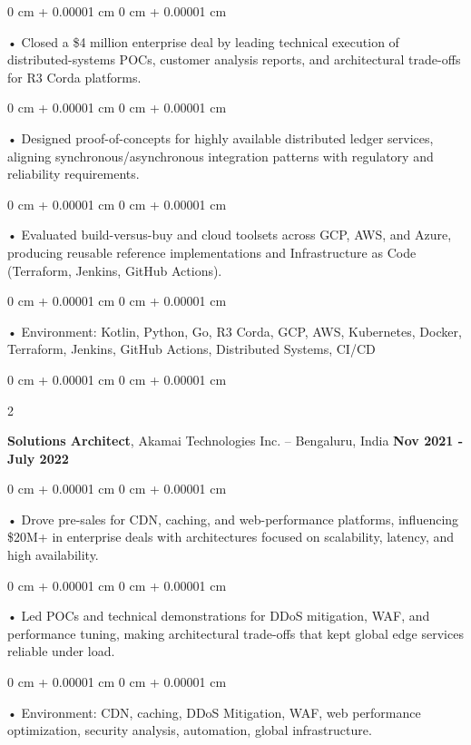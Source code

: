 \documentclass[10pt, letterpaper]{article}
\newenvironment{onecolentry}{
    \begin{adjustwidth}{
        0 cm + 0.00001 cm
    }{
        0 cm + 0.00001 cm
    }
}{
    \end{adjustwidth}
} %
\newenvironment{twocolentry}[2][]{
    \onecolentry
    \def\secondColumn{#2}
    \setcolumnwidth{\fill, 4.5 cm}
    \begin{paracol}{2}
}{
    \switchcolumn \raggedleft \secondColumn
    \end{paracol}
    \endonecolentry
} %
\begin{document}
        \begin{onecolentry}
             • Closed a \$4 million enterprise deal by leading technical execution of distributed-systems POCs, customer analysis reports, and architectural trade-offs for R3 Corda platforms.
        \end{onecolentry}
        \begin{onecolentry}
             • Designed proof-of-concepts for highly available distributed ledger services, aligning synchronous/asynchronous integration patterns with regulatory and reliability requirements.
        \end{onecolentry}
        \begin{onecolentry}
             • Evaluated build-versus-buy and cloud toolsets across GCP, AWS, and Azure, producing reusable reference implementations and Infrastructure as Code (Terraform, Jenkins, GitHub Actions).
        \end{onecolentry}
        \begin{onecolentry}
             • Environment: Kotlin, Python, Go, R3 Corda, GCP, AWS, Kubernetes, Docker, Terraform, Jenkins, GitHub Actions, Distributed Systems, CI/CD
        \end{onecolentry}
        \vspace{0.1cm}

        \begin{twocolentry}{
            \textbf{Nov 2021 - July 2022}
        }
            \textbf{Solutions Architect}, Akamai Technologies Inc. -- Bengaluru, India \end{twocolentry}
        \begin{onecolentry}
            • Drove pre-sales for CDN, caching, and web-performance platforms, influencing \$20M+ in enterprise deals with architectures focused on scalability, latency, and high availability.
        \end{onecolentry}
        \begin{onecolentry}
            • Led POCs and technical demonstrations for DDoS mitigation, WAF, and performance tuning, making architectural trade-offs that kept global edge services reliable under load.
        \end{onecolentry}
        \begin{onecolentry}
             • Environment: CDN, caching, DDoS Mitigation, WAF, web performance optimization, security analysis, automation, global infrastructure.
        \end{onecolentry}
\end{document}

